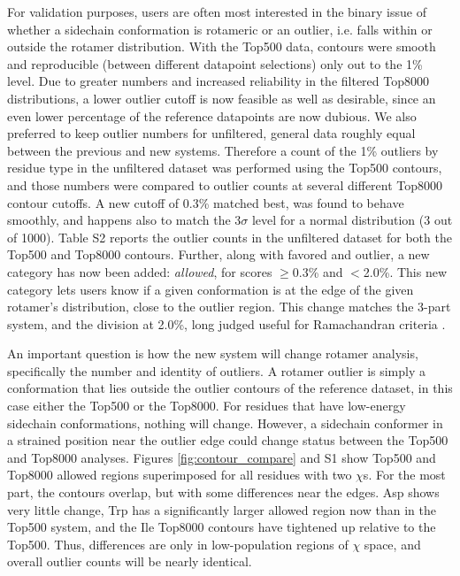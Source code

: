 For validation purposes, users are often most interested in the binary issue of whether a sidechain conformation is rotameric or an outlier, i.e. falls within or outside the rotamer distribution. With the Top500 data, contours were smooth and reproducible (between different datapoint selections) only out to the 1\% level. Due to greater numbers and increased reliability in the filtered Top8000 distributions, a lower outlier cutoff is now feasible as well as desirable, since an even lower percentage of the reference datapoints are now dubious. We also preferred to keep outlier numbers for unfiltered, general data roughly equal between the previous and new systems. Therefore a count of the 1\% outliers by residue type in the unfiltered dataset was performed using the Top500 contours, and those numbers were compared to outlier counts at several different Top8000 contour cutoffs. A new cutoff of 0.3\% matched best, was found to behave smoothly, and happens also to match the 3$\sigma$ level for a normal distribution (3 out of 1000). \textcolor{changecolor}{Table S2 reports the outlier counts in the unfiltered dataset for both the Top500 and Top8000 contours.} Further, along with favored and outlier, a new category has now been added: \textit{allowed}, for scores $\ge$0.3\% and $<$2.0\%. This new category lets users know if a given conformation is at the edge of the given rotamer's distribution, close to the outlier region. This change matches the 3-part system, and the division at 2.0\%, long judged useful for Ramachandran criteria \cite{Kleywegt1996, Hooft1996, Lovell:2003uq}.

An important question is how the new system will change rotamer analysis, specifically the number and identity of outliers. A rotamer outlier is simply a conformation that lies outside the outlier contours of the reference dataset, in this case either the Top500 or the Top8000. For residues that have low-energy sidechain conformations, nothing will change. However, a sidechain conformer in a strained position near the outlier edge could change status between the Top500 and Top8000 analyses. Figure\textcolor{changecolor}{s} \ref{fig:contour_compare} \textcolor{changecolor}{and S1 show} Top500 and Top8000 allowed regions superimposed for \textcolor{changecolor}{all residues with two $\chi$s}. For the most part, the contours overlap, but with some differences near the edges. Asp shows very little change, Trp has a significantly larger allowed region now than in the Top500 system, and the Ile Top8000 contours have tightened up relative to the Top500. Thus, differences are only in low-population regions of $\chi$ space, and overall outlier counts will be nearly identical.


